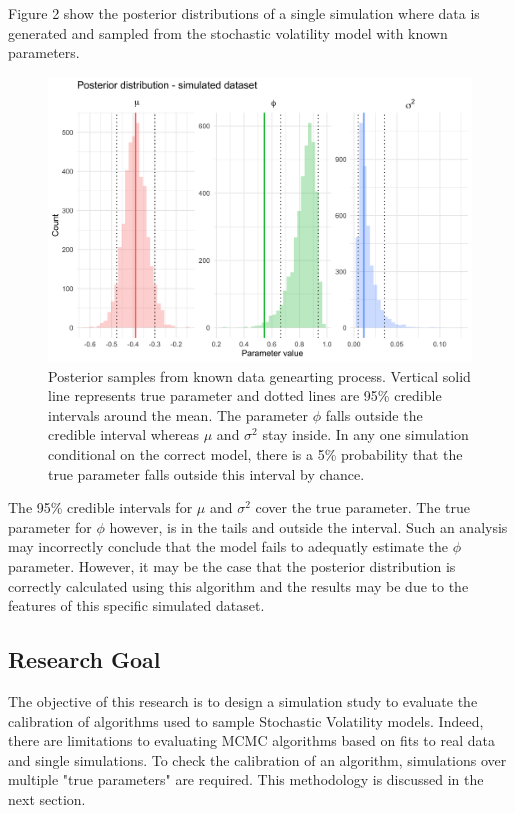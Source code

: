 \documentclass[12pt, a4paper]{article}
\begin{document}
    Figure 2 show the posterior distributions of a single simulation where data is generated and sampled from the stochastic volatility model with known parameters.

    \begin{figure}[h]
        \centering
        \includegraphics[scale=0.1]{motivating_example/single_sim.png}
        \caption{Posterior samples from known data genearting process. Vertical solid line represents true parameter and dotted lines are 95\% credible intervals around the mean. The parameter $\phi$ falls outside the credible interval whereas $\mu$ and $\sigma^2$ stay inside. In any one simulation conditional on the correct model, there is a 5\% probability that the true parameter falls outside this interval by chance.}
    \end{figure}

    The 95\% credible intervals for $\mu$ and $\sigma^2$ cover the true parameter. The true parameter for $\phi$ however, is in the tails and outside the interval. Such an analysis may incorrectly conclude that the model fails to adequatly estimate the $\phi$ parameter. However, it may be the case that the posterior distribution is correctly calculated using this algorithm and the results may be due to the features of this specific simulated dataset.

\subsection{Research Goal}
    The objective of this research is to design a simulation study to evaluate the calibration of algorithms used to sample Stochastic Volatility models. Indeed, there are limitations to evaluating MCMC algorithms based on fits to real data and single simulations. To check the calibration of an algorithm, simulations over multiple "true parameters" are required. This methodology is discussed in the next section. 
\end{document}
